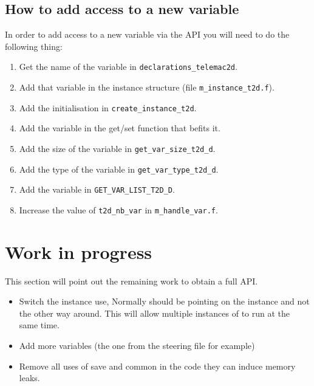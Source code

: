 \subsection{How to add access to a new variable}
%
In order to add access to a new variable via the API you will need to do the following thing:
\begin{enumerate}
\item Get the name of the variable in \verb!declarations_telemac2d!.
\item Add that variable in the instance structure (file \verb!m_instance_t2d.f!).
\item Add the initialisation in \verb!create_instance_t2d!.
\item Add the variable in the get/set function that befits it.
\item Add the size of the variable in \verb!get_var_size_t2d_d!.
\item Add the type of the variable in \verb!get_var_type_t2d_d!.
\item Add the variable in \verb!GET_VAR_LIST_T2D_D!.
\item Increase the value of \verb!t2d_nb_var! in \verb!m_handle_var.f!.
\end{enumerate}
%
\section{Work in progress}
%
This section will point out the remaining work to obtain a full API.
\begin{itemize}
\item Switch the instance use, Normally  should be pointing on the
instance and not the other way around. This will allow multiple instances of
 to run at the same time.
\item Add more variables (the one from the steering file for example)
\item Remove all uses of save and common in the code they can induce memory
leaks.
\end{itemize}
